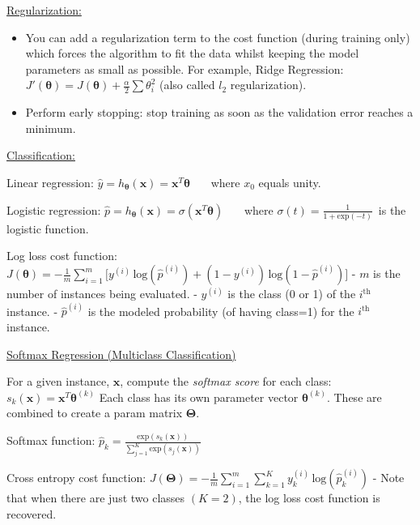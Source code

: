 \underline{Regularization:}
\vspace{-3.0mm}
\begin{itemize}
\item
You can add a regularization term to the cost function (during training only)
which forces the algorithm to fit the data whilst keeping the model parameters as small as possible.\newline
For example, Ridge Regression:
$J'(\boldsymbol{\theta}) = J (\boldsymbol{\theta}) + \frac{\alpha}{2}\sum \theta_i^2$
(also called $l_2$ regularization).
\item
Perform early stopping: stop training as soon as the validation error reaches a minimum.
\end{itemize}

\underline{Classification:}

Linear regression:
$\hat{y} = h_{\boldsymbol{\theta}}(\boldsymbol{x}) = \boldsymbol{x}^{T} \boldsymbol{\theta}$
~~~where $x_0$ equals unity.

Logistic regression:
$\hat{p} = h_{\boldsymbol{\theta}}(\boldsymbol{x}) = \sigma({\boldsymbol{x}^{T} \boldsymbol{\theta}})$
~~~where $\sigma(t) = \frac{1}{1+\textrm{exp}(-t)}$~is the logistic function.

Log loss cost function:
$J(\boldsymbol{\theta}) = - \frac{1}{m} \sum_{i=1}^{m} \big[ y^{(i)} \, \textrm{log}(\hat{p}^{(i)}) + (1 - y^{(i)}) \, \textrm{log}(1 - \hat{p}^{(i)}) \big]$\newline
- $m$ is the number of instances being evaluated.\newline
- $y^{(i)}$ is the class (0 or 1) of the $i^{\textrm{th}}$ instance.\newline
- $\hat{p}^{(i)}$ is the modeled probability (of having class=1) for the $i^{\textrm{th}}$ instance.\newline

\underline{Softmax Regression (Multiclass Classification)}

For a given instance, $\boldsymbol{x}$, compute the \textit{softmax score} for each class:
$s_k(\boldsymbol{x}) = \boldsymbol{x}^T \boldsymbol{\theta}^{(k)}$\newline
Each class has its own parameter vector $\boldsymbol{\theta}^{(k)}$.
These are combined to create a param matrix $\boldsymbol{\Theta}$.

Softmax function:
$\hat{p}_k = \frac{\textrm{exp}(s_k(\boldsymbol{x}))}{\sum_{j=1}^{K} \textrm{exp}(s_j(\boldsymbol{x}))}$

Cross entropy cost function:
$J(\boldsymbol{\Theta}) = - \frac{1}{m} \sum_{i=1}^{m} \sum_{k=1}^{K} y_k^{(i)}\, \textrm{log}(\hat{p}_k^{(i)})$\newline
- Note that when there are just two classes $(K=2)$, the log loss cost function is recovered.

\newpage